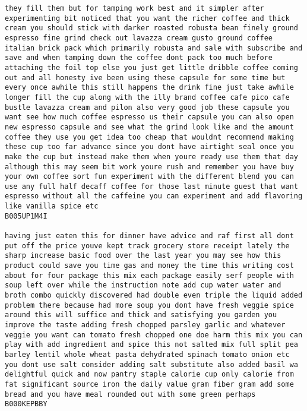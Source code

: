 \documentclass[11pt]{article}
\begin{document}
\begin{Verbatim}[commandchars=\\\{\}]
they fill them but for tamping work best and it simpler after experimenting bit noticed that you want the richer coffee and thick cream you should stick with darker roasted robusta bean finely ground espresso fine grind check out lavazza cream gusto ground coffee italian brick pack which primarily robusta and sale with subscribe and save and when tamping down the coffee dont pack too much before attaching the foil top else you just get little dribble coffee coming out and all honesty ive been using these capsule for some time but every once awhile this still happens the drink fine just take awhile longer fill the cup along with the illy brand coffee cafe pico cafe bustle lavazza cream and pilon also very good job these capsule you want see how much coffee espresso us their capsule you can also open new espresso capsule and see what the grind look like and the amount coffee they use you get idea too cheap that wouldnt recommend making these cup too far advance since you dont have airtight seal once you make the cup but instead make them when youre ready use them that day although this may seem bit work youre rush and remember you have buy your own coffee sort fun experiment with the different blend you can use any full half decaff coffee for those last minute guest that want espresso without all the caffeine you can experiment and add flavoring like vanilla spice etc
B005UP1M4I

having just eaten this for dinner have advice and raf first all dont put off the price youve kept track grocery store receipt lately the sharp increase basic food over the last year you may see how this product could save you time gas and money the time this writing cost about for four package this mix each package easily serf people with soup left over while the instruction note add cup water water and broth combo quickly discovered had double even triple the liquid added problem there because had more soup you dont have fresh veggie spice around this will suffice and thick and satisfying you garden you improve the taste adding fresh chopped parsley garlic and whatever veggie you want can tomato fresh chopped one doe harm this mix you can play with add ingredient and spice this not salted mix full split pea barley lentil whole wheat pasta dehydrated spinach tomato onion etc you dont use salt consider adding salt substitute also added basil wa delightful quick and now pantry staple calorie cup only calorie from fat significant source iron the daily value gram fiber gram add some bread and you have meal rounded out with some green perhaps
B000KEPBBY


\end{Verbatim}
\end{document}
